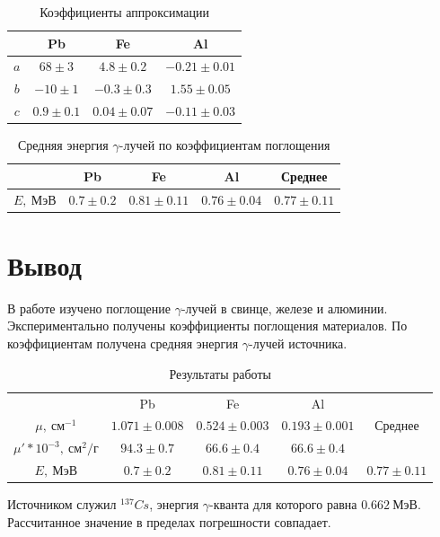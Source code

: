 \documentclass[a4paper, 12pt]{article}
\begin{document}
            \begin{table}[!ht]
                \centering
                \begin{tabular}{|c|c|c|c|}
                    \hline

                     & Pb & Fe & Al\\ \hline
                    $a$ & $68 \pm 3$ & $4.8 \pm 0.2$ & $-0.21 \pm 0.01$\\ \hline
                    $b$ & $-10 \pm 1$ & $-0.3 \pm 0.3$ & $1.55 \pm 0.05$\\ \hline
                    $c$& $0.9 \pm 0.1$ & $0.04 \pm 0.07$ & $-0.11 \pm 0.03$\\ \hline

                \end{tabular}
                \caption{Коэффициенты аппроксимации}
                \label{tab:approx_coeffs}
            \end{table}

            \begin{table}[!ht]
                \centering
                \begin{tabular}{|c|c|c|c|c|}
                    \hline

                     & Pb & Fe & Al & Среднее\\ \hline
                    $E,~МэВ$ & $0.7 \pm 0.2$ & $0.81 \pm 0.11$ & $0.76 \pm 0.04$ & $0.77 \pm 0.11$\\ \hline

                \end{tabular}
                \caption{Средняя энергия $\gamma$-лучей по коэффициентам поглощения}
                \label{tab:E}
            \end{table}

    \section{Вывод}

        В работе изучено поглощение $\gamma$-лучей в свинце, железе и алюминии. Экспериментально получены коэффициенты поглощения материалов. По коэффициентам получена средняя энергия $\gamma$-лучей источника.

        \begin{table}[!ht]
            \centering
            \begin{tabular}{|c|c|c|c|c|}
                \hline

                 & Pb & Fe & Al & \multirow{3}{*}{Среднее}\\ \cline{1-4}
                $\mu,~см^{-1}$ & $1.071 \pm 0.008$ & $0.524 \pm 0.003$ & $0.193 \pm 0.001$ &\\ \cline{1-4}
                $\mu'*10^{-3},~см^2/г$ & $94.3 \pm 0.7$ & $66.6 \pm 0.4$ & $66.6 \pm 0.4$ &\\ \hline
                $E,~МэВ$ & $0.7 \pm 0.2$ & $0.81 \pm 0.11$ & $0.76 \pm 0.04$ & $0.77 \pm 0.11$\\ \hline

            \end{tabular}
            \caption{Результаты работы}
            \label{tab:res}
        \end{table}

        Источником служил $^{137}Cs$, энергия $\gamma$-кванта для которого равна $0.662~МэВ$. Рассчитанное значение в пределах погрешности совпадает.
\end{document}
